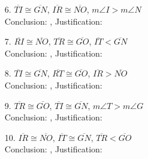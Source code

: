 \begin{enumerate}[label = \arabic*. ]
\item[6. ] $\overline{TI} \cong \overline{GN}$, $\overline{IR} \cong \overline{NO}$, $m\angle{I} > m\angle{N}$ \\
Conclusion: \blank,  Justification: \blank 
\item[7. ] $\overline{RI} \cong \overline{NO}$, $\overline{TR} \cong \overline{GO}$, $\overline{IT} < \overline{GN} $ \\
Conclusion: \blank,  Justification: \blank 
\item[8. ] $\overline{TI} \cong \overline{GN}$, $\overline{RT} \cong \overline{GO}$, $\overline{IR} > \overline{NO} $ \\
Conclusion: \blank,  Justification: \blank 
\item[9. ] $\overline{TR} \cong \overline{GO}$, $\overline{TI} \cong \overline{GN}$, $m\angle{T} > m\angle{G}$ \\
Conclusion: \blank,  Justification: \blank 
\item[10. ] $\overline{IR} \cong \overline{NO}$, $\overline{IT} \cong \overline{GN}$, $\overline{TR} < \overline{GO} $ \\
Conclusion: \blank,  Justification: \blank 
\end{enumerate}  



